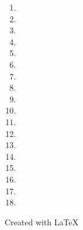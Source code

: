 \documentclass {article}
\begin{document}
\begin{multicols}{2}
\begin {enumerate}
\item \dotfill \hspace*{10mm}
\item \dotfill \hspace*{10mm}
\item \dotfill \hspace*{10mm}
\item \dotfill \hspace*{10mm}
\item \dotfill \hspace*{10mm}
\item \dotfill \hspace*{10mm}
\item \dotfill \hspace*{10mm}
\item \dotfill \hspace*{10mm}
\item \dotfill \hspace*{10mm}
\item \dotfill \hspace*{10mm}
\item \dotfill \hspace*{10mm}
\item \dotfill \hspace*{10mm}
\item \dotfill \hspace*{10mm}
\item \dotfill \hspace*{10mm}
\item \dotfill \hspace*{10mm}
\item \dotfill \hspace*{10mm}
\item \dotfill \hspace*{10mm}
\item \dotfill
\end {enumerate}
\end {multicols}
\vfill
\small{Created with \LaTeX}
\end{document}
